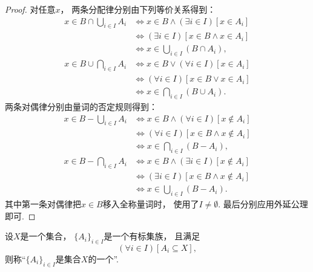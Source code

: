 \begin{theorem}
\begin{proof}
        对任意\(x\)，
        两条分配律分别由下列等价关系得到：
        \begin{align*}
            x\in B\cap\bigcup_{i\in I}A_i
            &\iff x\in B\land(\exists i\in I)[x\in A_i] \\
            &\iff(\exists i\in I)[x\in B\land x\in A_i] \\
            &\iff x\in\bigcup_{i\in I}(B\cap A_i), \\
            x\in B\cup\bigcap_{i\in I}A_i
            &\iff x\in B\lor(\forall i\in I)[x\in A_i] \\
            &\iff(\forall i\in I)[x\in B\lor x\in A_i] \\
            &\iff x\in\bigcap_{i\in I}(B\cup A_i).
        \end{align*}
        两条对偶律分别由量词的否定规则得到：
        \begin{align*}
            x\in B-\bigcup_{i\in I}A_i
            &\iff x\in B\land(\forall i\in I)[x\notin A_i] \\
            &\iff(\forall i\in I)[x\in B\land x\notin A_i] \\
            &\iff x\in\bigcap_{i\in I}(B-A_i), \\
            x\in B-\bigcap_{i\in I}A_i
            &\iff x\in B\land(\exists i\in I)[x\notin A_i] \\
            &\iff(\exists i\in I)[x\in B\land x\notin A_i] \\
            &\iff x\in\bigcup_{i\in I}(B-A_i).
        \end{align*}
        其中第一条对偶律把\(x\in B\)移入全称量词时，
        使用了\(I\neq\emptyset\).
        最后分别应用外延公理即可.
    \end{proof}
\end{theorem}

\begin{definition}
设\(X\)是一个集合，
\(\{A_i\}_{i \in I}\)是一个有标集族，
且满足\begin{equation*}
	(\forall i \in I)
	[A_i \subseteq X],
\end{equation*}
则称“\(\{A_i\}_{i \in I}\)是集合\(X\)的一个”.
\end{definition}

